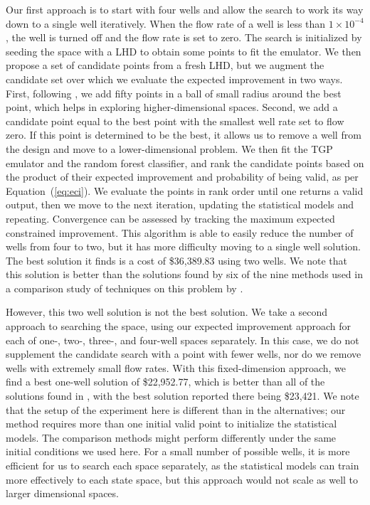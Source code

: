 \documentclass[12pt]{article}
\begin{document}
Our first approach is to start with four wells and allow the search to
work its way down to a single well iteratively.  When the flow rate of
a well is less than $1 \times 10^{-4}$, the well is turned off and the
flow rate is set to zero.  The search is initialized by seeding the
space with a LHD to obtain some points to fit the emulator.  We then
propose a set of candidate points from a fresh LHD, but we augment the
candidate set over which we evaluate the expected improvement in two
ways.  First, following \cite{tadd:lee:gray:grif:2009}, we add fifty
points in a ball of small radius around the best point, which helps in
exploring higher-dimensional spaces.  Second, we add a candidate point
equal to the best point with the smallest well rate set to flow zero.
If this point is determined to be the best, it allows us to remove a
well from the design and move to a lower-dimensional problem.  We then
fit the TGP emulator and the random forest classifier, and rank the
candidate points based on the product of their expected improvement
and probability of being valid, as per Equation~(\ref{eq:eci}).  We
evaluate the points in rank order until one returns a valid output,
then we move to the next iteration, updating the statistical models
and repeating.  Convergence can be assessed by tracking the maximum
expected constrained improvement.  This algorithm is able to easily
reduce the number of wells from four to two, but it has more
difficulty moving to a single well solution.  The best solution it
finds is a cost of \$36,389.83 using two wells. We note that this
solution is better than the solutions found by six of the nine methods
used in a comparison study of techniques on this problem by
\cite{fowl:2008}.

However, this two well solution is not the best solution.  We take a
second approach to searching the space, using our expected improvement
approach for each of one-, two-, three-, and four-well spaces
separately.  In this case, we do not supplement the candidate search
with a point with fewer wells, nor do we remove wells with extremely
small flow rates.  With this fixed-dimension approach, we find a best
one-well solution of \$22,952.77, which is better than all of the
solutions found in \cite{fowl:2008}, with the best solution reported
there being \$23,421.  We note that the setup of the experiment here
is different than in the alternatives; our method requires more than
one initial valid point to initialize the statistical models. The
comparison methods might perform differently under the same initial
conditions we used here.  For a small number of possible wells, it is
more efficient for us to search each space separately, as the
statistical models can train more effectively to each state space, but
this approach would not scale as well to larger dimensional spaces.
\end{document}

